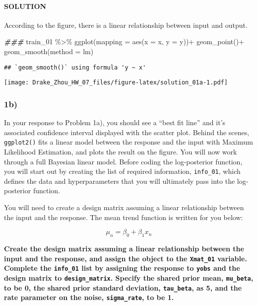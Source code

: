 \documentclass[
]{article}
\newenvironment{Shaded}{\begin{snugshade}}{\end{snugshade}}
\newcommand{\AttributeTok}[1]{\textcolor[rgb]{0.77,0.63,0.00}{#1}}
\newcommand{\DocumentationTok}[1]{\textcolor[rgb]{0.56,0.35,0.01}{\textbf{\textit{#1}}}}
\newcommand{\FunctionTok}[1]{\textcolor[rgb]{0.00,0.00,0.00}{#1}}
\newcommand{\NormalTok}[1]{#1}
\newcommand{\SpecialCharTok}[1]{\textcolor[rgb]{0.00,0.00,0.00}{#1}}
\newcommand{\StringTok}[1]{\textcolor[rgb]{0.31,0.60,0.02}{#1}}
\begin{document}
\hypertarget{solution}{%
\paragraph{SOLUTION}\label{solution}}

According to the figure, there is a linear relationship between input
and output.

\begin{Shaded}
\begin{Highlighting}[]
\DocumentationTok{\#\#\#}
\NormalTok{train\_01 }\SpecialCharTok{\%\textgreater{}\%} 
  \FunctionTok{ggplot}\NormalTok{(}\AttributeTok{mapping =} \FunctionTok{aes}\NormalTok{(}\AttributeTok{x =}\NormalTok{ x, }\AttributeTok{y =}\NormalTok{ y))}\SpecialCharTok{+}
  \FunctionTok{geom\_point}\NormalTok{()}\SpecialCharTok{+}
  \FunctionTok{geom\_smooth}\NormalTok{(}\AttributeTok{method =} \StringTok{\textquotesingle{}lm\textquotesingle{}}\NormalTok{)}
\end{Highlighting}
\end{Shaded}

\begin{verbatim}
## `geom_smooth()` using formula 'y ~ x'
\end{verbatim}

\texttt{[image: Drake\_Zhou\_HW\_07\_files/figure-latex/solution\_01a-1.pdf]}

\hypertarget{b}{%
\subsubsection{1b)}\label{b}}

In your response to Problem 1a), you should see a ``best fit line'' and
it's associated confidence interval displayed with the scatter plot.
Behind the scenes, \texttt{ggplot2()} fits a linear model between the
response and the input with Maximum Likelihood Estimation, and plots the
result on the figure. You will now work through a full Bayesian linear
model. Before coding the log-posterior function, you will start out by
creating the list of required information, \texttt{info\_01}, which
defines the data and hyperparameters that you will ultimately pass into
the log-posterior function.

You will need to create a design matrix assuming a linear relationship
between the input and the response. The mean trend function is written
for you below:

\[ 
\mu_n = \beta_0 + \beta_1 x_{n}
\]

\textbf{Create the design matrix assuming a linear relationship between
the input and the response, and assign the object to the
\texttt{Xmat\_01} variable. Complete the \texttt{info\_01} list by
assigning the response to \texttt{yobs} and the design matrix to
\texttt{design\_matrix}. Specify the shared prior mean,
\texttt{mu\_beta}, to be 0, the shared prior standard deviation,
\texttt{tau\_beta}, as 5, and the rate parameter on the noise,
\texttt{sigma\_rate}, to be 1.}
\end{document}
